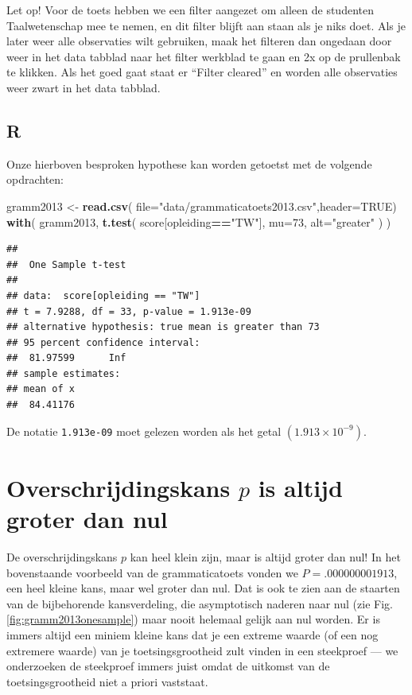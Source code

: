 \documentclass[
]{book}
\newenvironment{Shaded}{\begin{snugshade}}{\end{snugshade}}
\newcommand{\DataTypeTok}[1]{\textcolor[rgb]{0.13,0.29,0.53}{#1}}
\newcommand{\DecValTok}[1]{\textcolor[rgb]{0.00,0.00,0.81}{#1}}
\newcommand{\KeywordTok}[1]{\textcolor[rgb]{0.13,0.29,0.53}{\textbf{#1}}}
\newcommand{\NormalTok}[1]{#1}
\newcommand{\OperatorTok}[1]{\textcolor[rgb]{0.81,0.36,0.00}{\textbf{#1}}}
\newcommand{\OtherTok}[1]{\textcolor[rgb]{0.56,0.35,0.01}{#1}}
\newcommand{\StringTok}[1]{\textcolor[rgb]{0.31,0.60,0.02}{#1}}
\begin{document}
Let op! Voor de toets hebben we een filter aangezet om alleen de studenten Taalwetenschap mee te nemen, en dit filter blijft aan staan als je niks doet. Als je later weer alle observaties wilt gebruiken, maak het filteren dan ongedaan door weer in het data tabblad naar het filter werkblad te gaan en 2x op de prullenbak te klikken. Als het goed gaat staat er ``Filter cleared'' en worden alle observaties weer zwart in het data tabblad.

\hypertarget{r-12}{%
\subsection{R}\label{r-12}}

Onze hierboven besproken hypothese kan worden getoetst met de volgende opdrachten:

\begin{Shaded}
\begin{Highlighting}[]
\NormalTok{gramm2013 \textless{}{-}}\StringTok{ }\KeywordTok{read.csv}\NormalTok{( }\DataTypeTok{file=}\StringTok{"data/grammaticatoets2013.csv"}\NormalTok{,}\DataTypeTok{header=}\OtherTok{TRUE}\NormalTok{)}
\KeywordTok{with}\NormalTok{( gramm2013,}
      \KeywordTok{t.test}\NormalTok{( score[opleiding}\OperatorTok{==}\StringTok{"TW"}\NormalTok{], }\DataTypeTok{mu=}\DecValTok{73}\NormalTok{, }\DataTypeTok{alt=}\StringTok{"greater"}\NormalTok{ ) )}
\end{Highlighting}
\end{Shaded}

\begin{verbatim}
## 
##  One Sample t-test
## 
## data:  score[opleiding == "TW"]
## t = 7.9288, df = 33, p-value = 1.913e-09
## alternative hypothesis: true mean is greater than 73
## 95 percent confidence interval:
##  81.97599      Inf
## sample estimates:
## mean of x 
##  84.41176
\end{verbatim}

De notatie \texttt{1.913e-09} moet gelezen worden als het getal
\((1.913 \times 10^{-9})\).

\hypertarget{sec:pgroterdannul}{%
\section{\texorpdfstring{Overschrijdingskans \(p\) is altijd groter dan nul}{Overschrijdingskans p is altijd groter dan nul}}\label{sec:pgroterdannul}}

De overschrijdingskans \(p\) kan heel klein zijn, maar is altijd groter
dan nul! In het bovenstaande voorbeeld van de grammaticatoets
vonden we \(P=.000000001913\), een heel kleine kans, maar wel groter dan
nul. Dat is ook te zien aan de staarten van de bijbehorende
kansverdeling, die asymptotisch naderen naar nul (zie
Fig.\ref{fig:gramm2013onesample}) maar nooit helemaal gelijk aan nul
worden. Er is immers altijd een miniem kleine kans dat je een extreme
waarde (of een nog extremere waarde) van je toetsingsgrootheid zult
vinden in een steekproef --- we onderzoeken de steekproef immers juist
omdat de uitkomst van de toetsingsgrootheid niet a priori vaststaat.
\end{document}
